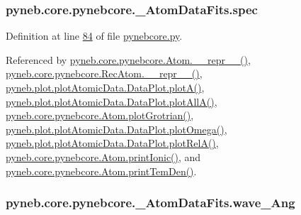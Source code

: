 \hypertarget{classpyneb_1_1core_1_1pynebcore_1_1___atom_data_fits_a28f8a716cd11ea24726de792fdfb5573}{}
\subsubsection[{spec}]{\setlength{\rightskip}{0pt plus 5cm}pyneb.\+core.\+pynebcore.\+\_\+\+Atom\+Data\+Fits.\+spec}\label{classpyneb_1_1core_1_1pynebcore_1_1___atom_data_fits_a28f8a716cd11ea24726de792fdfb5573}


Definition at line \hyperlink{pynebcore_8py_source_l00084}{84} of file \hyperlink{pynebcore_8py_source}{pynebcore.\+py}.



Referenced by \hyperlink{pynebcore_8py_source_l02544}{pyneb.\+core.\+pynebcore.\+Atom.\+\_\+\+\_\+repr\+\_\+\+\_\+()}, \hyperlink{pynebcore_8py_source_l03032}{pyneb.\+core.\+pynebcore.\+Rec\+Atom.\+\_\+\+\_\+repr\+\_\+\+\_\+()}, \hyperlink{plot_atomic_data_8py_source_l00116}{pyneb.\+plot.\+plot\+Atomic\+Data.\+Data\+Plot.\+plot\+A()}, \hyperlink{plot_atomic_data_8py_source_l00188}{pyneb.\+plot.\+plot\+Atomic\+Data.\+Data\+Plot.\+plot\+All\+A()}, \hyperlink{pynebcore_8py_source_l02372}{pyneb.\+core.\+pynebcore.\+Atom.\+plot\+Grotrian()}, \hyperlink{plot_atomic_data_8py_source_l00372}{pyneb.\+plot.\+plot\+Atomic\+Data.\+Data\+Plot.\+plot\+Omega()}, \hyperlink{plot_atomic_data_8py_source_l00261}{pyneb.\+plot.\+plot\+Atomic\+Data.\+Data\+Plot.\+plot\+Rel\+A()}, \hyperlink{pynebcore_8py_source_l02167}{pyneb.\+core.\+pynebcore.\+Atom.\+print\+Ionic()}, and \hyperlink{pynebcore_8py_source_l02253}{pyneb.\+core.\+pynebcore.\+Atom.\+print\+Tem\+Den()}.

\hypertarget{classpyneb_1_1core_1_1pynebcore_1_1___atom_data_fits_a904df923201dd16936845199622afc76}{}
\subsubsection[{wave\+\_\+\+Ang}]{\setlength{\rightskip}{0pt plus 5cm}pyneb.\+core.\+pynebcore.\+\_\+\+Atom\+Data\+Fits.\+wave\+\_\+\+Ang}\label{classpyneb_1_1core_1_1pynebcore_1_1___atom_data_fits_a904df923201dd16936845199622afc76}


